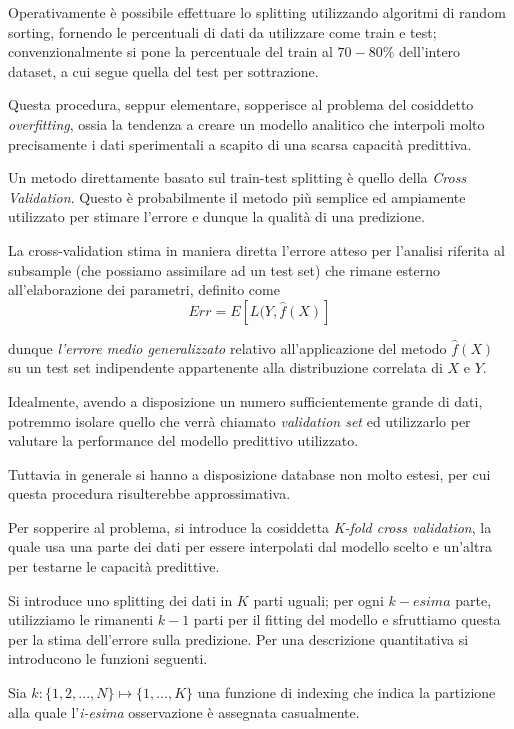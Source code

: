 \documentclass[12pt,openright,twoside,a4paper]{book}
\begin{document}
Operativamente è possibile effettuare lo splitting utilizzando algoritmi di random sorting, fornendo le percentuali di dati da utilizzare come train e test; convenzionalmente si pone la percentuale del train al $70-80\%$ dell'intero dataset, a cui segue quella del test per sottrazione.

Questa procedura, seppur elementare, sopperisce al problema del cosiddetto \textit{overfitting}, ossia la tendenza a creare un modello analitico che interpoli molto precisamente i dati sperimentali a scapito di una scarsa capacità predittiva.

Un metodo direttamente basato sul train-test splitting è quello della \textit{Cross Validation}.
Questo è probabilmente il metodo più semplice ed ampiamente utilizzato per stimare l'errore e dunque la qualità di una predizione.

La cross-validation stima in maniera diretta l'errore atteso per l'analisi riferita al subsample (che possiamo assimilare ad un test set) che rimane esterno all'elaborazione dei parametri, definito come
\begin{equation}
Err=E[L(Y,\hat{f}(X)]
\end{equation}

dunque \textit{l'errore medio generalizzato} relativo all'applicazione del metodo $\hat{f}(X)$ su un test set indipendente appartenente alla distribuzione correlata di $X$ e $Y$.

Idealmente, avendo a disposizione un numero sufficientemente grande di dati, potremmo isolare quello che verrà chiamato \textit{validation set} ed utilizzarlo per valutare la performance del modello predittivo utilizzato.

Tuttavia in generale si hanno a disposizione database non molto estesi, per cui questa procedura risulterebbe approssimativa.

Per sopperire al problema, si introduce la cosiddetta \textit{K-fold cross validation}, la quale usa una parte dei dati per essere interpolati dal modello scelto e un'altra per testarne le capacità predittive.

Si introduce uno splitting dei dati in $K$ parti uguali; per ogni $k-esima$ parte, utilizziamo le rimanenti $k-1$ parti per il fitting del modello e sfruttiamo questa per la stima dell'errore sulla predizione.
Per una descrizione quantitativa si introducono le funzioni seguenti.

Sia $k:\{1,2,...,N\}\longmapsto\{1,...,K\}$ una funzione di indexing che indica la partizione alla quale l'\textit{i-esima} osservazione è assegnata casualmente.
\end{document}
